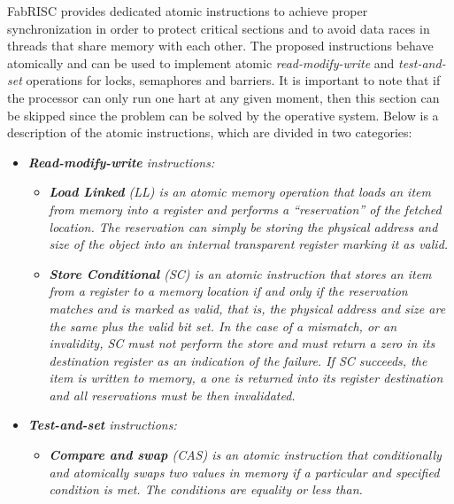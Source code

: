 \documentclass{article}
\begin{document}
            \vspace{10pt}

            FabRISC provides dedicated atomic instructions to achieve proper synchronization in order to protect critical sections and to avoid data races in threads that share memory with each other. The proposed instructions behave atomically and can be used to implement atomic \textit{read-modify-write} and \textit{test-and-set} operations for locks, semaphores and barriers. It is important to note that if the processor can only run one hart at any given moment, then this section can be skipped since the problem can be solved by the operative system. Below is a description of the atomic instructions, which are divided in two categories:

            \begin{itemize}

                \item \textit{\textbf{Read-modify-write} instructions:}

                \begin{itemize}

                    \item \textit{\textbf{Load Linked} (LL) is an atomic memory operation that loads an item from memory into a register and performs a ``reservation'' of the fetched location. The reservation can simply be storing the physical address and size of the object into an internal transparent register marking it as valid.}

                    \item \textit{\textbf{Store Conditional} (SC) is an atomic instruction that stores an item from a register to a memory location if and only if the reservation matches and is marked as valid, that is, the physical address and size are the same plus the valid bit set. In the case of a mismatch, or an invalidity, SC must not perform the store and must return a zero in its destination register as an indication of the failure. If SC succeeds, the item is written to memory, a one is returned into its register destination and all reservations must be then invalidated.}

                \end{itemize}

                \item \textit{\textbf{Test-and-set} instructions:}

                \begin{itemize}

                    \item \textit{\textbf{Compare and swap} (CAS) is an atomic instruction that conditionally and atomically swaps two values in memory if a particular and specified condition is met. The conditions are equality or less than.}

                \end{itemize}

            \end{itemize}
\end{document}
